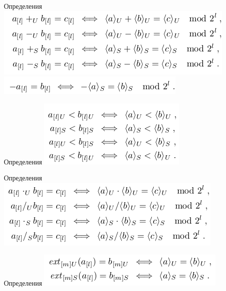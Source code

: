 \documentclass{beamer}
\begin{document}
\begin{frame}{Определения}
\includegraphics[scale=0.5]{sum.png}\newline
\includegraphics[scale=0.5]{unary.png}\newline
\end{frame}

\begin{frame}{Определения}
\includegraphics[scale=0.5]{rel.png}\newline
\end{frame}

\begin{frame}{Определения}
\includegraphics[scale=0.5]{mul.png}\newline
\end{frame}

\begin{frame}{Определения}
\includegraphics[scale=0.5]{ext.png}\newline
\end{frame}
\end{document}

